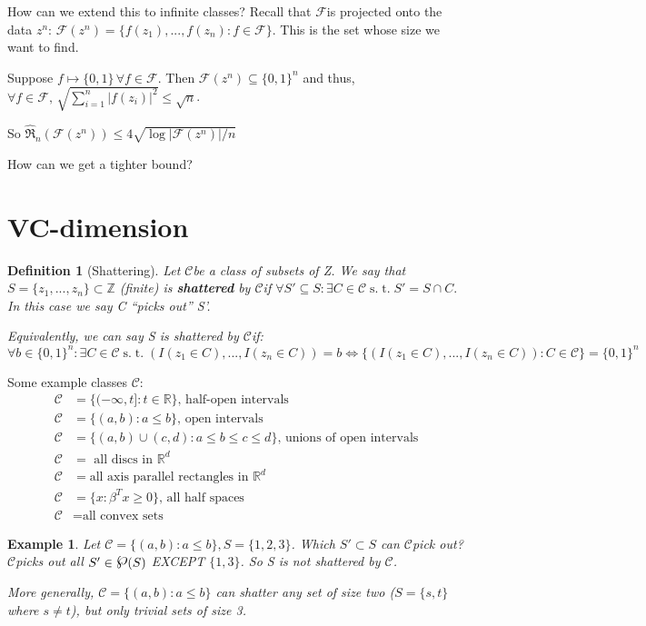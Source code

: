 \documentclass[10pt]{article}
\newtheorem{definition}[def]{Definition}
\newtheorem{example}[ex]{Example}
\renewcommand{\hat}{\widehat}
\newcommand{\F}{\mathcal{F}}
\newcommand{\R}{\mathbb{R}}
\newcommand{\Z}{\mathbb{Z}}
\newcommand{\pow}{\raisebox{.15\baselineskip}{\Large\ensuremath{\wp}}}
\newcommand{\rad}{\ensuremath{\mathfrak{R}}}
\renewcommand{\F}{\ensuremath{\mathcal{F}}}
\newcommand{\C}{\ensuremath{\mathcal{C}}}
\newcommand{\st}{\ensuremath{\;\mathrm{s.}\;\mathrm{t.}\;}}
\begin{document}
How can we extend this to infinite classes?
Recall that \F is projected onto the data $z^n:\,\F(z^n) = \{f(z_1),...,f(z_n):f\in\F\}$.
This is the set whose size we want to find.

Suppose $f \mapsto \{0,1\}\,\forall f\in\F$.
Then $\F(z^n)\subseteq\{0,1\}^n$ and thus,
$\forall f\in\F, \, \sqrt{\sum_{i=1}^n|f(z_i)|^2}\leq\sqrt{n}$.


So $\hat{\rad}_n(\F(z^n))\leq4\sqrt{\log|\F(z^n)|/n}$

How can we get a tighter bound?

\section{VC-dimension}
\begin{definition}[Shattering]
  Let \C be a class of subsets of Z.  We say that $S=\{z_1,...,z_n\}\subset\Z$ (finite) 
  is \textbf{shattered} by \C if $\forall S'\subseteq S:\exists C\in \C\st S'=S\cap C.$
  In this case we say C ``picks out'' S'.
  
Equivalently, we can say S is shattered by \C if:
\[
\forall b\in \{0,1\}^n:\exists C\in \C\st (I(z_1\in C),...,I(z_n\in C))=b
\iff \{(I(z_1\in C),...,I(z_n\in C)):C\in\C\} = \{0,1\}^n
  \]
  \end{definition}


Some example classes \C:
\begin{align}
  \C&=\{(-\infty,t]:t\in\R\} \text{, half-open intervals}\\
  \C&=\{(a,b):a\leq b\} \text{, open intervals}\\
  \C&=\{(a,b)\cup(c,d):a\leq b\leq c\leq d\} \text{, unions of open intervals}\\
\C&= \text{ all discs in }\R^d \\
\C&= \text{all axis parallel rectangles in }\R^d\\
\C&= \{x:\beta^Tx\geq0\} \text{, all half spaces}\\
\C&= \text{all convex sets}
    \end{align}

\begin{example}
Let $\C=\{(a,b):a\leq b\}, S=\{1,2,3\}$.
Which $S'\subset S$ can \C pick out?
\C picks out all $S'\in\pow(S)$ EXCEPT $\{1,3\}$.  So S is not shattered by \C.

More generally, $\C=\{(a,b):a\leq b\}$ can shatter any set of size two ($S=\{s,t\}$ where $ s\neq t$),
but only trivial sets of size 3.
\end{example}    
  
\end{document}
